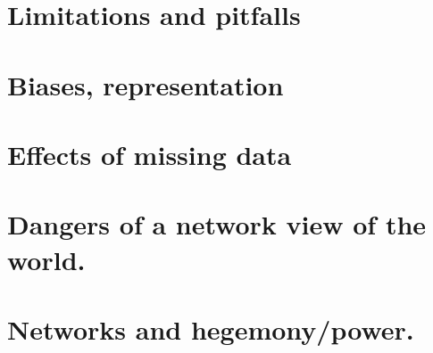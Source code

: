\documentclass[
]{book}
\begin{document}
\hypertarget{limitations-and-pitfalls}{%
\section{Limitations and pitfalls}\label{limitations-and-pitfalls}}

\hypertarget{biases-representation}{%
\section{Biases, representation}\label{biases-representation}}

\hypertarget{effects-of-missing-data}{%
\section{Effects of missing data}\label{effects-of-missing-data}}

\hypertarget{dangers-of-a-network-view-of-the-world.}{%
\section{Dangers of a network view of the world.}\label{dangers-of-a-network-view-of-the-world.}}

\hypertarget{networks-and-hegemonypower.}{%
\section{Networks and hegemony/power.}\label{networks-and-hegemonypower.}}

  
\end{document}
